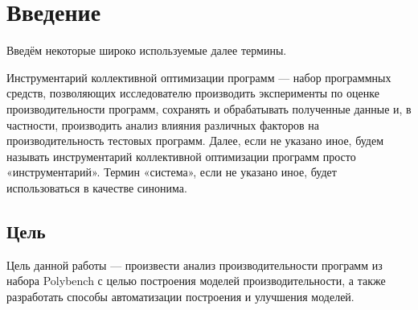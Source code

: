 \section*{Введение}
%

Введём некоторые широко используемые далее термины.

Инструментарий коллективной оптимизации программ --- набор программных средств, позволяющих исследователю производить эксперименты по оценке производительности программ, сохранять и обрабатывать полученные данные и, в частности, производить анализ влияния различных факторов на производительность тестовых программ. Далее, если не указано иное, будем называть инструментарий коллективной оптимизации программ просто «инструментарий». Термин «система», если не указано иное, будет использоваться в качестве синонима.

\subsection*{Цель}
%
Цель данной работы --- произвести анализ производительности программ из набора Polybench с целью построения моделей производительности, а также разработать способы автоматизации построения и улучшения моделей.

